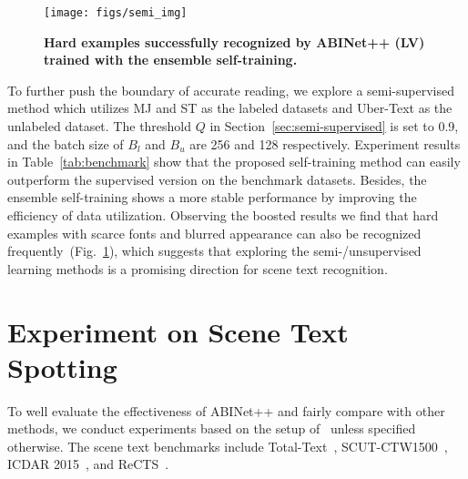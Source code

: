 \documentclass[10pt,journal,compsoc]{IEEEtran}
\begin{document}
\begin{figure}
   \begin{center}
      \texttt{[image: figs/semi\_img]}
      \caption{\textbf{Hard examples successfully recognized by ABINet++ (LV) trained with the ensemble self-training.}}
      \label{fig:semi_img}
   \end{center}
   \vspace{-2em}
\end{figure}


To further push the boundary of accurate reading, we explore a semi-supervised method which utilizes MJ and ST as the labeled datasets and Uber-Text as the unlabeled dataset. The threshold $Q$ in Section~\ref{sec:semi-supervised} is set to 0.9, and the batch size of $B_l$ and $B_u$ are 256 and 128 respectively. Experiment results in Table~\ref{tab:benchmark} show that the proposed self-training method can easily outperform the supervised version on the benchmark datasets. Besides, the ensemble self-training shows a more stable performance by improving the efficiency of data utilization. Observing the boosted results we find that hard examples with scarce fonts and blurred appearance can also be recognized frequently~(Fig.~\ref{fig:semi_img}), which suggests that exploring the semi-/unsupervised learning methods is a promising direction for scene text recognition. 


\section{Experiment on Scene Text Spotting}

To well evaluate the effectiveness of ABINet++ and fairly compare with other methods, we conduct experiments based on the setup of~\cite{liu2020abcnetv2,liu2020abcnet} unless specified otherwise. The scene text benchmarks include Total-Text~\cite{ch2020total}, SCUT-CTW1500~\cite{liu2019curved}, ICDAR 2015~\cite{karatzas2015icdar}, and ReCTS~\cite{zhang2019icdar}.
\end{document}
